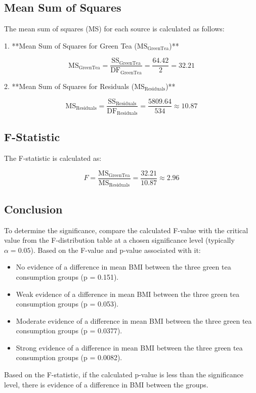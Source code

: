 \documentclass{article}
\begin{document}
\subsection*{Mean Sum of Squares}

The mean sum of squares (MS) for each source is calculated as follows:

1. **Mean Sum of Squares for Green Tea (\(\text{MS}_{\text{GreenTea}}\))**

   \[
   \text{MS}_{\text{GreenTea}} = \frac{\text{SS}_{\text{GreenTea}}}{\text{DF}_{\text{GreenTea}}} = \frac{64.42}{2} = 32.21
   \]

2. **Mean Sum of Squares for Residuals (\(\text{MS}_{\text{Residuals}}\))**

   \[
   \text{MS}_{\text{Residuals}} = \frac{\text{SS}_{\text{Residuals}}}{\text{DF}_{\text{Residuals}}} = \frac{5809.64}{534} \approx 10.87
   \]

\subsection*{F-Statistic}

The F-statistic is calculated as:

\[
F = \frac{\text{MS}_{\text{GreenTea}}}{\text{MS}_{\text{Residuals}}} = \frac{32.21}{10.87} \approx 2.96
\]

\subsection*{Conclusion}

To determine the significance, compare the calculated F-value with the critical value from the F-distribution table at a chosen significance level (typically \(\alpha = 0.05\)). Based on the F-value and p-value associated with it:

\begin{itemize}
    \item No evidence of a difference in mean BMI between the three green tea consumption groups (p = 0.151).
    \item Weak evidence of a difference in mean BMI between the three green tea consumption groups (p = 0.053).
    \item Moderate evidence of a difference in mean BMI between the three green tea consumption groups (p = 0.0377).
    \item Strong evidence of a difference in mean BMI between the three green tea consumption groups (p = 0.0082).
\end{itemize}

Based on the F-statistic, if the calculated p-value is less than the significance level, there is evidence of a difference in BMI between the groups. 
\end{document}
